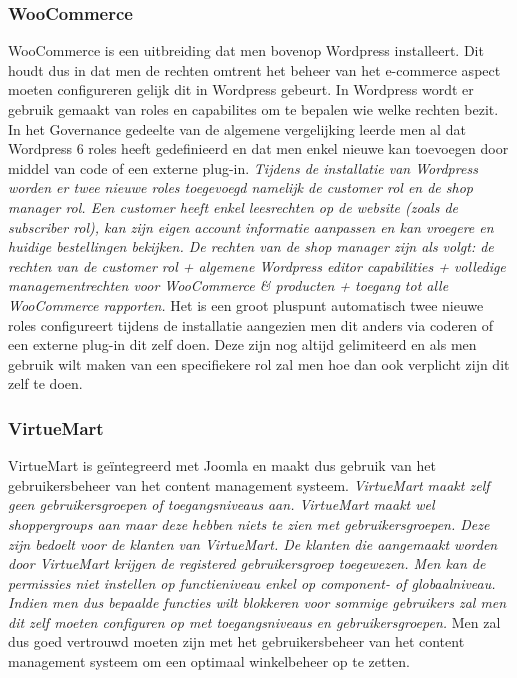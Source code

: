 \subsubsection{WooCommerce}
WooCommerce is een uitbreiding dat men bovenop Wordpress installeert. Dit houdt dus in dat men de rechten omtrent het beheer van het e-commerce aspect moeten configureren gelijk dit in Wordpress gebeurt. In Wordpress wordt er gebruik gemaakt van roles en capabilites om te bepalen wie welke rechten bezit. In het Governance gedeelte van de algemene vergelijking leerde men al dat Wordpress 6 roles heeft gedefinieerd en dat men enkel nieuwe kan toevoegen door middel van code of een externe plug-in.\textit{ Tijdens de installatie van Wordpress worden er twee nieuwe roles toegevoegd namelijk de customer rol en de shop manager rol. Een customer heeft enkel leesrechten op de website (zoals de subscriber rol), kan zijn eigen account informatie aanpassen en kan vroegere en huidige bestellingen bekijken. De rechten van de shop manager zijn als volgt: de rechten van de customer rol + algemene Wordpress editor capabilities + volledige managementrechten voor WooCommerce \& producten + toegang tot alle WooCommerce rapporten.} \autocite{WooCommerce2019} Het is een groot pluspunt automatisch twee nieuwe roles configureert tijdens de installatie aangezien men dit anders via coderen of een externe plug-in dit zelf doen. Deze zijn nog altijd gelimiteerd en als men gebruik wilt maken van een specifiekere rol zal men hoe dan ook verplicht zijn dit zelf te doen.
\subsubsection{VirtueMart}
VirtueMart is geïntegreerd met Joomla en maakt dus gebruik van het gebruikersbeheer van het content management systeem. \textit{VirtueMart maakt zelf geen gebruikersgroepen of toegangsniveaus aan. VirtueMart maakt wel shoppergroups aan maar deze hebben niets te zien met gebruikersgroepen. Deze zijn bedoelt voor de klanten van VirtueMart. De klanten die aangemaakt worden door VirtueMart krijgen de registered gebruikersgroep toegewezen. Men kan de permissies niet instellen op functieniveau enkel op component- of globaalniveau. Indien men dus bepaalde functies wilt blokkeren voor sommige gebruikers zal men dit zelf moeten configuren op met toegangsniveaus en gebruikersgroepen.} \autocite{VirtueMart2019a} Men zal dus goed vertrouwd moeten zijn met het gebruikersbeheer van het content management systeem om een optimaal winkelbeheer op te zetten.

